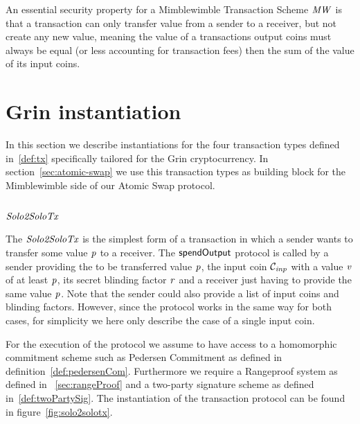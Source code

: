An essential security property for a Mimblewimble Transaction Scheme $\mathit{MW}$ is that a transaction can only transfer value from a sender to a receiver, but not create any new value, meaning the value
of a transactions output coins must always be equal (or less accounting for transaction fees) then the sum of the value of its input coins.

\begin{definition}

\end{definition}

\begin{definition}

\end{definition}

\begin{definition}

\end{definition}


\section{Grin instantiation}\label{sec:atomic-inst}

In this section we describe instantiations for the four transaction types defined in~\ref{def:tx} specifically tailored for the Grin cryptocurrency. In section~\ref{sec:atomic-swap} we use this transaction types as building block for the Mimblewimble side of our Atomic Swap protocol.

\subsection{$\mathit{Solo2SoloTx}$}

The $\mathit{Solo2SoloTx}$ is the simplest form of a transaction in which a sender wants to transfer some value $\mathit{p}$ to a receiver. The $\mathsf{spendOutput}$ protocol is called by a sender providing the to be transferred value
$\mathit{p}$, the input coin $\mathcal{C}_{\mathit{inp}}$ with a value $\mathit{v}$ of at least $\mathit{p}$, its secret blinding factor $\mathit{r}$ and a receiver just having to provide the same value $\mathit{p}$. Note that the
sender could also provide a list of input coins and blinding factors. However, since the protocol works in the same way for both cases, for simplicity we here only describe the case of a single input coin.

For the execution of the protocol we assume to have access to a homomorphic commitment scheme such as Pedersen Commitment as defined in definition~\ref{def:pedersenCom}. Furthermore we require a Rangeproof system as defined in
~\ref{sec:rangeProof} and a two-party signature scheme as defined in~\ref{def:twoPartySig}. The instantiation of the transaction protocol can be found in figure~\ref{fig:solo2solotx}.


